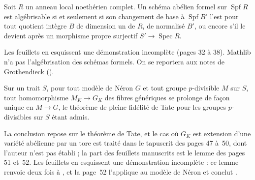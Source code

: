 \begin{encadre}
\begin{theoreme*}\nonverifie
Soit $R$ un anneau local noethérien complet. Un schéma abélien formel sur $\operatorname{Spf} R$ est algébrisable si et seulement si son changement de base à $\operatorname{Spf} B'$ l'est pour tout quotient intègre $B$ de dimension un de $R$, de normalisé $B'$, ou encore s'il le devient après un morphisme propre surjectif $S' \to \operatorname{Spec} R$.
\end{theoreme*}
\end{encadre}
{\small Les feuillets en esquissent une démonstration incomplète (pages 32 à 38). Mathlib n'a pas l'algébrisation des schémas formels. On se reportera aux notes de Grothendieck ().\par}

\begin{encadre}
\begin{theoreme*}\nonverifie
Sur un trait $S$, pour tout modèle de Néron $G$ et tout groupe $p$-divisible $M$ sur $S$, tout homomorphisme $M_K \to G_K$ des fibres génériques se prolonge de façon unique en $M \to G$, le théorème de pleine fidélité de Tate pour les groupes $p$-divisibles sur $S$ étant admis.
\end{theoreme*}
\end{encadre}
{\small La conclusion repose sur le théorème de Tate, et le cas où $G_K$ est extension d'une variété abélienne par un tore est traité dans le tapuscrit des pages 47 à~50, dont l'auteur n'est pas établi ; la part des feuillets manuscrits est le lemme des pages 51 et~52. Les feuillets en esquissent une démonstration incomplète : ce lemme renvoie deux fois à , et la page~52 l'applique au modèle de Néron et conclut .\par}
